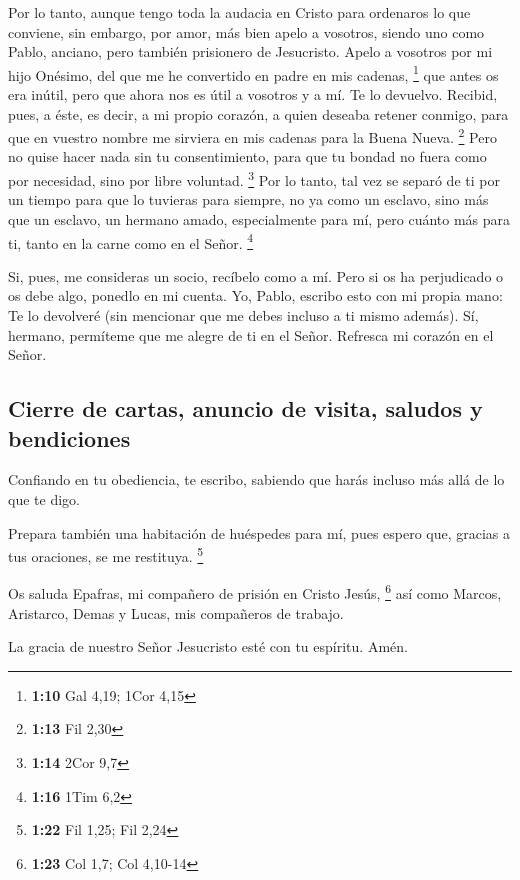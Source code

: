  Por lo tanto, aunque tengo toda la audacia en Cristo para
ordenaros lo que conviene,  sin embargo, por amor, más
bien apelo a vosotros, siendo uno como Pablo, anciano, pero también
prisionero de Jesucristo.  Apelo a vosotros por mi hijo
Onésimo, del que me he convertido en padre en mis cadenas, \footnote{\textbf{1:10}
  Gal 4,19; 1Cor 4,15}  que antes os era inútil, pero que
ahora nos es útil a vosotros y a mí.  Te lo devuelvo.
Recibid, pues, a éste, es decir, a mi propio corazón,  a
quien deseaba retener conmigo, para que en vuestro nombre me sirviera en
mis cadenas para la Buena Nueva. \footnote{\textbf{1:13} Fil 2,30}
 Pero no quise hacer nada sin tu consentimiento, para que
tu bondad no fuera como por necesidad, sino por libre voluntad.
\footnote{\textbf{1:14} 2Cor 9,7}  Por lo tanto, tal vez
se separó de ti por un tiempo para que lo tuvieras para siempre,
 no ya como un esclavo, sino más que un esclavo, un
hermano amado, especialmente para mí, pero cuánto más para ti, tanto en
la carne como en el Señor. \footnote{\textbf{1:16} 1Tim 6,2}

 Si, pues, me consideras un socio, recíbelo como a mí.
 Pero si os ha perjudicado o os debe algo, ponedlo en mi
cuenta.  Yo, Pablo, escribo esto con mi propia mano: Te
lo devolveré (sin mencionar que me debes incluso a ti mismo además).
 Sí, hermano, permíteme que me alegre de ti en el Señor.
Refresca mi corazón en el Señor.

\hypertarget{cierre-de-cartas-anuncio-de-visita-saludos-y-bendiciones}{%
\subsection{Cierre de cartas, anuncio de visita, saludos y
bendiciones}\label{cierre-de-cartas-anuncio-de-visita-saludos-y-bendiciones}}

 Confiando en tu obediencia, te escribo, sabiendo que
harás incluso más allá de lo que te digo.

 Prepara también una habitación de huéspedes para mí,
pues espero que, gracias a tus oraciones, se me restituya. \footnote{\textbf{1:22}
  Fil 1,25; Fil 2,24}

 Os saluda Epafras, mi compañero de prisión en Cristo
Jesús, \footnote{\textbf{1:23} Col 1,7; Col 4,10-14}  así
como Marcos, Aristarco, Demas y Lucas, mis compañeros de trabajo.

 La gracia de nuestro Señor Jesucristo esté con tu
espíritu. Amén.
